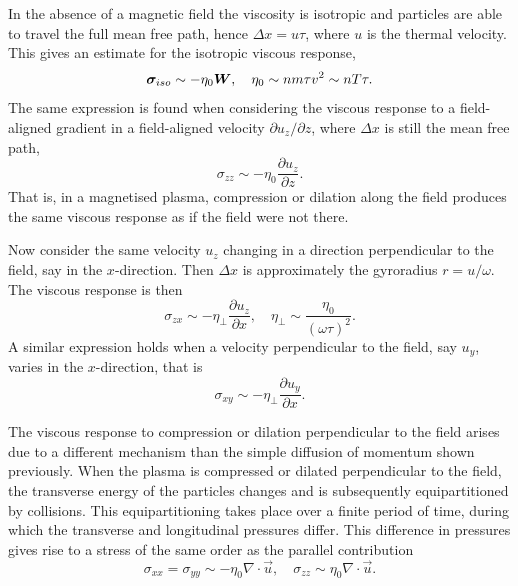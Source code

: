 In the absence of a magnetic field the viscosity is isotropic and particles are able to travel the full mean free path, hence $\Delta x = u \tau$, where $u$ is the thermal velocity. This gives an estimate for the isotropic viscous response,
\begin{equation}
  \label{eq:isotropic_eta_estimate}
  {\bm \sigma}_{iso} \sim - \eta_0 {\bm W}, \quad \eta_0 \sim nm\tau v^2 \sim nT \tau.
\end{equation}
The same expression is found when considering the viscous response to a field-aligned gradient in a field-aligned velocity $\partial u_z / \partial z$, where $\Delta x$ is still the mean free path,
\begin{equation}
  \label{eq:parallel_eta_estimate}
\sigma_{zz} \sim - \eta_0 \frac{\partial u_z}{\partial z}.
\end{equation}
That is, in a magnetised plasma, compression or dilation along the field produces the same viscous response as if the field were not there.

Now consider the same velocity $u_z$ changing in a direction perpendicular to the field, say in the $x$-direction. Then $\Delta x$ is approximately the gyroradius $r = u/\omega$. The viscous response is then
\begin{equation}
  \label{eq:perp_eta_estimate}
\sigma_{zx} \sim - \eta_{\perp} \frac{\partial u_z}{\partial x}, \quad \eta_{\perp} \sim \frac{\eta_0}{(\omega \tau)^2}.
\end{equation}
A similar expression holds when a velocity perpendicular to the field, say $u_y$, varies in the $x$-direction, that is
\begin{equation}
  \label{eq:perp_eta_estimate2}
\sigma_{xy} \sim - \eta_{\perp} \frac{\partial u_y}{\partial x}.
\end{equation}

The viscous response to compression or dilation perpendicular to the field arises due to a different mechanism than the simple diffusion of momentum shown previously. When the plasma is compressed or dilated perpendicular to the field, the transverse energy of the particles changes and is subsequently equipartitioned by collisions. This equipartitioning takes place over a finite period of time, during which the transverse and longitudinal pressures differ. This difference in pressures gives rise to a stress of the same order as the parallel contribution
\begin{equation}
  \label{eq:compression_eta_estimate}
\sigma_{xx} = \sigma_{yy} \sim - \eta_0 \nabla \cdot \vec{u}, \quad \sigma_{zz} \sim \eta_0 \nabla \cdot \vec{u}.
\end{equation}

